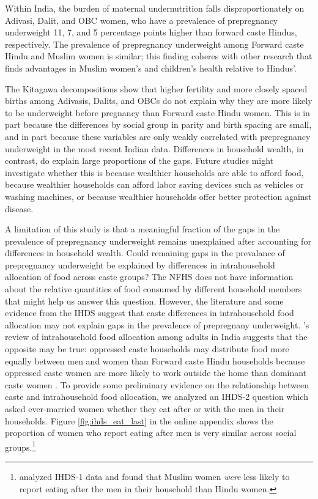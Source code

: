 \documentclass[12pt]{article}
\begin{document}
Within India, the burden of maternal undernutrition falls disproportionately on Adivasi, Dalit, and OBC women, who have a prevalence of prepregnancy underweight 11, 7, and 5 percentage points higher than forward caste Hindus, respectively.  The prevalence of prepregnancy underweight among Forward caste Hindu and Muslim women is similar; this finding coheres with other research that finds advantages in Muslim women's and children's health relative to Hindus'.   

The Kitagawa decompositions show that higher fertility and more closely spaced births among Adivasis, Dalits, and OBCs do not explain why they are more likely to be underweight before pregnancy than Forward caste Hindu women.  This is in part because the differences by social group in parity and birth spacing are small, and in part because these variables are only weakly correlated with prepregnancy underweight in the most recent Indian data. Differences in household wealth, in contrast, do explain large proportions of the gaps.  Future studies might investigate whether this is because wealthier households are able to afford food, because wealthier households can afford labor saving devices such as vehicles or washing machines, or because wealthier households offer better protection against disease. 

A limitation of this study is that a meaningful fraction of the gaps in the prevalence of prepregnancy underweight remains unexplained after accounting for differences in household wealth.  Could remaining gaps in the prevalance of prepregnancy underweight be explained by differences in intrahousehold allocation of food across caste groups? The NFHS does not have information about the relative quantities of food consumed by different household members that might help us answer this question.  However, the literature and some evidence from the IHDS suggest that caste differences in intrahousehold food allocation may not explain gaps in the prevalence of prepregnany underweight.  \cite{harris2017determinants}'s review  of intrahousehold food allocation among adults in India suggests that the opposite may be true: oppressed caste households may distribute food more equally between men and women than Forward caste Hindu households because oppressed caste women are more likely to work outside the home than dominant caste women \citep{chakrabarty1996gender, eswaran2013status}.  To provide some preliminary evidence on the relationship between caste and intrahousehold food allocation, we analyzed an IHDS-2 question which asked ever-married women whether they eat after or with the men in their households.  Figure \ref{fig:ihds_eat_last} in the online appendix shows the proportion of women who report eating after men is very similar across social groups.\footnote{\cite{desai2014muslim} analyzed IHDS-1 data and found that Muslim women \emph{were} less likely to report eating after the men in their household than Hindu women.}  
\end{document}
